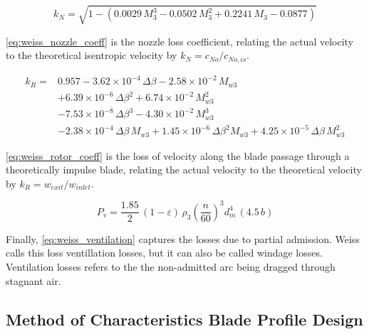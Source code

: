 \begin{equation}
    k_N = \sqrt{1 - \left( 0.0029\,M_3^3 - 0.0502\,M_3^2 + 0.2241\,M_3 - 0.0877 \right)}
    \label{eq:weiss_nozzle_coeff}
\end{equation}

\cref{eq:weiss_nozzle_coeff} is the nozzle loss coefficient, relating the actual velocity to the theoretical isentropic velocity by $k_N=c_{No}/c_{No,is}$. 

\begin{equation}
    \begin{aligned}
        k_R ={}& 0.957
            - 3.62\times10^{-4}\,\Delta\beta
            - 2.58\times10^{-2}\,M_{w3} \\
            &+ 6.39\times10^{-6}\,\Delta\beta^2
            + 6.74\times10^{-2}\,M_{w3}^2 \\
            &- 7.53\times10^{-8}\,\Delta\beta^3
            - 4.30\times10^{-2}\,M_{w3}^3 \\
            &- 2.38\times10^{-4}\,\Delta\beta\, M_{w3}
            + 1.45\times10^{-6}\,\Delta\beta^2 M_{w3}
            + 4.25\times10^{-5}\,\Delta\beta\, M_{w3}^2
    \end{aligned}
    \label{eq:weiss_rotor_coeff}
\end{equation}

\cref{eq:weiss_rotor_coeff} is the loss of velocity along the blade passage through a theoretically impulse blade, relating the actual velocity to the theoretical velocity by $k_R=w_{exit}/w_{inlet}$.

\begin{equation}
    P_v = \frac{1.85}{2}\,(1 - \varepsilon)\,\rho_3 \left( \frac{n}{60} \right)^{3} d_m^4 \,(4.5\,b)
    \label{eq:weiss_ventilation}
\end{equation}

Finally, \cref{eq:weiss_ventilation} captures the losses due to partial admission. Weiss calls this loss ventillation losses, but it can also be called windage losses. Ventilation losses refers to the the non-admitted arc being dragged through stagnant air.



\subsection{Method of Characteristics Blade Profile Design}
\label{subsec:method_of_characteristics}

